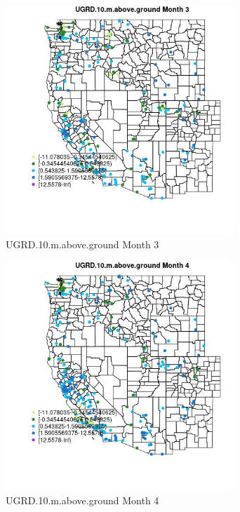 \begin{figure} 
\centering  
\includegraphics[width=0.77\textwidth]{Code_Outputs/Report_ML_input_PM25_Step4_part_e_de_duplicated_aveswNAs_MapObsMo3UGRD10maboveground.jpg} 
\caption{\label{fig:Report_ML_input_PM25_Step4_part_e_de_duplicated_aveswNAsMapObsMo3UGRD10maboveground}UGRD.10.m.above.ground Month 3} 
\end{figure} 
 

\begin{figure} 
\centering  
\includegraphics[width=0.77\textwidth]{Code_Outputs/Report_ML_input_PM25_Step4_part_e_de_duplicated_aveswNAs_MapObsMo4UGRD10maboveground.jpg} 
\caption{\label{fig:Report_ML_input_PM25_Step4_part_e_de_duplicated_aveswNAsMapObsMo4UGRD10maboveground}UGRD.10.m.above.ground Month 4} 
\end{figure} 
 

